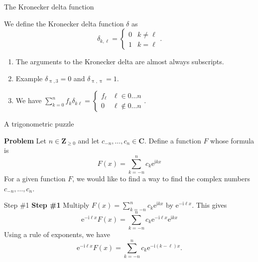 \documentclass[portrait,fleqn,12pt]{beamer}
\newcommand{\complex}{\mathbf{C}}
\newcommand{\integers}{\mathbf{Z}}
\newcommand{\euler}{\mathrm{e}}
\newcommand{\imag}{\mathrm{i}}
\newenvironment{handlist}
   {\begin{enumerate}[\faHandPointRight]
       \addtolength{\itemsep}{0.0\itemsep}}
     {\end{enumerate}}
\begin{document}
\begin{frame}{The  Kronecker delta function}

We define the Kronecker delta function $\delta$ as
\begin{equation*}
   \delta_{k, \ell} = \begin{cases} 0 & k \neq \ell \\ 1 & k= \ell \end{cases}.
\end{equation*}

\begin{handlist}
\item The arguments to the Kronecker delta are almost always subscripts.

\item Example $\delta_{\uppi, 3} = 0$ and $\delta_{\uppi, \uppi} = 1$.

\item We have $\sum_{k=0}^n f_k \delta_{k\ell} = \begin{cases} f_\ell &  \ell \in 0 \dots n \\ 0 & \ell \notin 0 \dots n  \end{cases}$.
\end{handlist}
\end{frame}


\begin{frame}{A trigonometric puzzle}

\textbf{Problem} Let $n \in \integers_{\geq 0}$ and let $c_{-n}, \dots, c_n \in \complex$. Define a 
function $F$ whose formula is 
\begin{equation*}
    F(x) = \sum_{k=-n}^n c_k \euler^{\imag  k x}
\end{equation*}
For a given function $F$, we would like to find a way to find the complex numbers $c_{-n}, \dots, c_n$.

\end{frame}

\begin{frame}{Step \#1}
\textbf{Step \#1} Multiply $\displaystyle F(x) = \sum_{k=-n}^n c_k \euler^{\imag  k x}$  by $\euler^{-\imag  \ell x}$. This 
gives
\begin{equation}
    \euler^{-\imag  \ell x} F(x) = \sum_{k=-n}^n c_k 
    \euler^{-\imag  \ell x} \euler^{\imag  k x}
\end{equation}
Using a rule of exponents, we have
\begin{equation}
    \euler^{-\imag  \ell x} F(x) = \sum_{k=-n}^n c_k 
    \euler^{-\imag  (k - \ell) x}.
\end{equation}
\end{frame}
\end{document}

